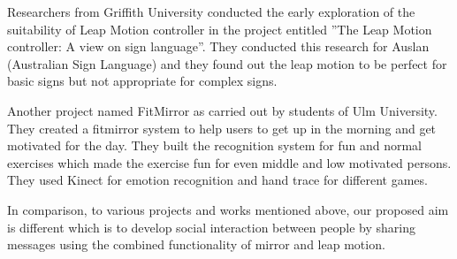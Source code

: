 Researchers from Griffith University conducted the early exploration of the suitability of Leap Motion controller in the project entitled ''The Leap Motion controller: A view on sign language''. They conducted this research for Auslan (Australian Sign Language) and they found out the leap motion to be perfect for basic signs but not appropriate for complex signs.

Another project named FitMirror as carried out by students of Ulm University. They created a fitmirror system to help users to get up in the morning and get motivated for the day. They built the recognition system for fun and normal exercises which made the exercise fun for even middle and low motivated persons. They used Kinect for emotion recognition and hand trace for different games.

In comparison, to various projects and works mentioned above, our proposed aim is different which is to develop social interaction between people by sharing messages using the combined functionality of mirror and leap motion.